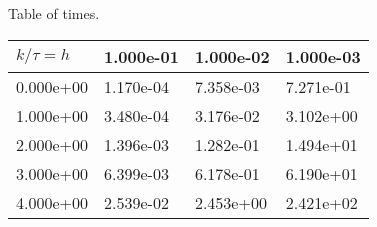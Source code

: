 \begin{center}
Table of times.
  
\begin{tabular}{|p{1in}|p{1in}|p{1in}|p{1in}|} \hline
$k / \tau = h$ &1.000e-01 &1.000e-02 &1.000e-03 \\ \hline 
0.000e+00 &1.170e-04 &7.358e-03 &7.271e-01 \\ \hline 
1.000e+00 &3.480e-04 &3.176e-02 &3.102e+00 \\ \hline 
2.000e+00 &1.396e-03 &1.282e-01 &1.494e+01 \\ \hline 
3.000e+00 &6.399e-03 &6.178e-01 &6.190e+01 \\ \hline 
4.000e+00 &2.539e-02 &2.453e+00 &2.421e+02 \\ \hline 

\end{tabular}\\[20pt]
\end{center}
